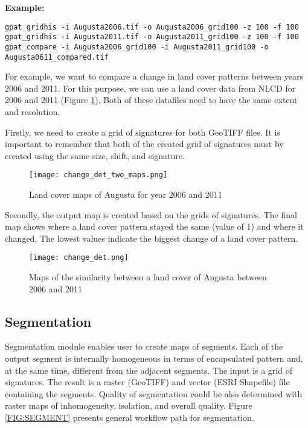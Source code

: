 {\bf Example:}

\begin{minipage}{\linewidth}
\begin{lstlisting}
gpat_gridhis -i Augusta2006.tif -o Augusta2006_grid100 -z 100 -f 100
gpat_gridhis -i Augusta2011.tif -o Augusta2011_grid100 -z 100 -f 100
gpat_compare -i Augusta2006_grid100 -i Augusta2011_grid100 -o Augusta0611_compared.tif
\end{lstlisting}
\end{minipage}

For example, we want to compare a change in land cover patterns between years 2006 and 2011. 
For this purpose, we can use a land cover data from NLCD for 2006 and 2011 (Figure \ref{FIG:CHANGEDET1}).
Both of these datafiles need to have the same extent and resolution.

Firstly, we need to create a grid of signatures for both GeoTIFF files.
It is important to remember that both of the created grid of signatures must by created using the same size, shift, and signature.

\begin{figure}[H]
	\centering
	\texttt{[image: change\_det\_two\_maps.png]}
	\caption{Land cover maps of Augusta for year 2006 and 2011}
	\label{FIG:CHANGEDET1}
\end{figure}

Secondly, the output map is created based on the grids of signatures.
The final map shows where a land cover pattern stayed the same (value of 1) and where it changed. 
The lowest values indicate the biggest change of a land cover pattern.

\begin{figure}[H]
	\centering
	\texttt{[image: change\_det.png]}
	\caption{Maps of the similarity between a land cover of Augusta between 2006 and 2011}
	\label{FIG:CHANGEDET2}
\end{figure}

\FloatBarrier

\subsection{Segmentation \label{segmentation}}

Segmentation module enables user to create maps of segments.
Each of the output segment is internally homogeneous in terms of encapsulated pattern and, at the same time, different from the adjacent segments.
The input is a grid of signatures.
The result is a raster (GeoTIFF) and vector (ESRI Shapefile) file containing the segments.
Quality of segmentation could be also determined with raster maps of inhomogeneity, isolation, and overall quality.
Figure \ref{FIG:SEGMENT} presents general workflow path for segmentation. 

